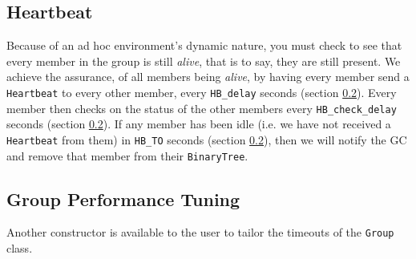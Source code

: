 \documentclass[12pt]{article}
\newcommand{\code}[1]{\texttt{#1}}
\begin{document}
      \subsection{Heartbeat}
      \label{xref:heartbeat}
	Because of an ad hoc environment's dynamic nature, you must check to see
	that every member in the group is still \textit{alive}, that is to say,
	they are still present.  We achieve the assurance, of all members
	being \textit{alive}, by having every member send a \code{Heartbeat}
	to every other member, every \code{HB\_delay} seconds (section 
	\ref{xref:group_performance_tuning}).  Every member then checks on
	the status of the other members every \code{HB\_check\_delay} seconds
	(section \ref{xref:group_performance_tuning}). If any member has been
	idle (i.e. we have not received a \code{Heartbeat} from them) in 
	\code{HB\_TO} seconds (section \ref{xref:group_performance_tuning}), 
	then we will notify the GC and remove that member from their 
	\code{BinaryTree}.

      \newpage
      \subsection{Group Performance Tuning}
      \label{xref:group_performance_tuning}
       Another constructor is available to the user to tailor the timeouts of
       the \code{Group} class. 
\end{document}
